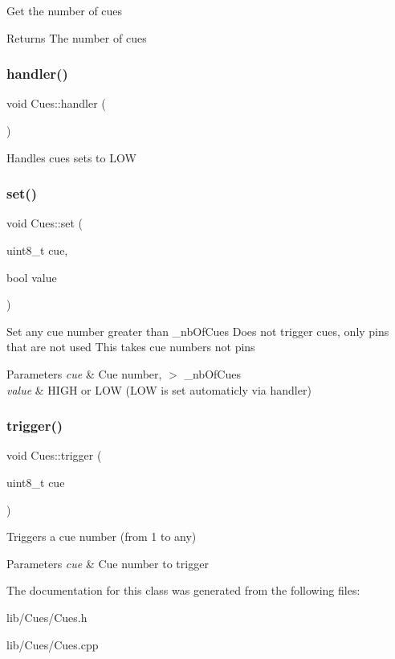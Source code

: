 Get the number of cues \begin{DoxyReturn}{Returns}
The number of cues 
\end{DoxyReturn}
\mbox{\label{class_cues_afeafbb13d2cf0190867dfc719c954b0a}} 
\subsubsection{\texorpdfstring{handler()}{handler()}}
{\footnotesize\ttfamily void Cues\+::handler (\begin{DoxyParamCaption}{ }\end{DoxyParamCaption})}

Handles cues sets to L\+OW \mbox{\label{class_cues_a6885f81fba1f48a3c3364c6e42b2a169}} 
\subsubsection{\texorpdfstring{set()}{set()}}
{\footnotesize\ttfamily void Cues\+::set (\begin{DoxyParamCaption}\item[{uint8\+\_\+t}]{cue,  }\item[{bool}]{value }\end{DoxyParamCaption})}

Set any cue number greater than \+\_\+nb\+Of\+Cues Does not trigger cues, only pins that are not used This takes cue numbers not pins 
\begin{DoxyParams}{Parameters}
{\em cue} & Cue number, $>$ \+\_\+nb\+Of\+Cues \\
\hline
{\em value} & H\+I\+GH or L\+OW (L\+OW is set automaticly via handler) \\
\hline
\end{DoxyParams}
\mbox{\label{class_cues_abc065af1058efc265ac3ffdf795b5e90}} 
\subsubsection{\texorpdfstring{trigger()}{trigger()}}
{\footnotesize\ttfamily void Cues\+::trigger (\begin{DoxyParamCaption}\item[{uint8\+\_\+t}]{cue }\end{DoxyParamCaption})}

Triggers a cue number (from 1 to any) 
\begin{DoxyParams}{Parameters}
{\em cue} & Cue number to trigger \\
\hline
\end{DoxyParams}


The documentation for this class was generated from the following files\+:\begin{DoxyCompactItemize}
\item 
lib/\+Cues/Cues.\+h\item 
lib/\+Cues/Cues.\+cpp\end{DoxyCompactItemize}
